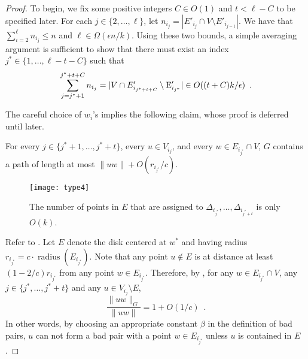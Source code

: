 \documentclass{patmorin}
\DeclareMathOperator{\radius}{radius}
\begin{document}
\begin{proof}
  To begin, we fix some positive integers $C\in O(1)$ and $t< \ell
  - C$ to be specified later.  For each $j\in\{2,\ldots,\ell\}$,
  let $n_{i_j}=|E'_{i_j}\cap V\setminus E'_{i_{j-1}}|$. We have that
  $\sum_{i=2}^{\ell} n_{i_j} \le n$ and $\ell \in\Omega(\epsilon n/k)$.
  Using these two bounds, a simple averaging argument is sufficient
  to show that there must exist an index $j^*\in\{1,\ldots,\ell-t-C\}$
  such that
  \begin{equation}
     \sum_{j=j^*+1}^{j^*+t+C} n_{i_j}
        = |V\cap E'_{i_{j^*+t+C}}\setminus \E'_{i_{j^*}}| 
          \in O((t+C)k/\epsilon) \enspace . \eqlabel{sparse}
  \end{equation}

  The careful choice of $w_i$'s implies the following claim, whose proof
  is deferred until later.
  \begin{clm}
    For every $j\in\{j^*+1,\ldots,j^*+t\}$, every $u\in V_{i_j}$, and
    every $w\in E_{i_{j^*}}\cap V$, $G$ contains a path of length at most
    $\|uw\|+O(r_{i_{j^*}}/c)$.
  \end{clm}

  
  \begin{figure}
    \begin{center}
      \texttt{[image: type4]}
    \end{center}
    \caption{The number of points in $E$ that are assigned to
      $\Delta_{i_{j^*}},\ldots,\Delta_{i_{j^*+t}}$
      is only $O(k)$.}
  \end{figure}

  Refer to .  Let $E$ denote the disk centered at $w^*$
  and having radius $r_{i_{j^*}}=c\cdot\radius(E_{i_{j^*}})$.  Note that
  any point $u\not\in E$ is at distance at least $(1-2/c)r_{i_{j^*}}$ from
  any point $w\in E_{i_{j^*}}$.  Therefore, by , for any
  $w\in E_{i_{j^*}}\cap V$, any $j\in\{j^*,\ldots,j^*+t\}$ and any $u\in
  V_{i_{j}}\setminus E$,
  \[  
     \frac{\|uw\|_G}{\|uw\|} = 1+O(1/c) \enspace . 
  \]
  In other words, by choosing an appropriate constant $\beta$ in the
  definition of bad pairs, $u$ can not form a bad pair with a point
  $w\in E_{i_{j^*}}$ unless $u$ is contained in $E$.



\end{proof}
\end{document}
